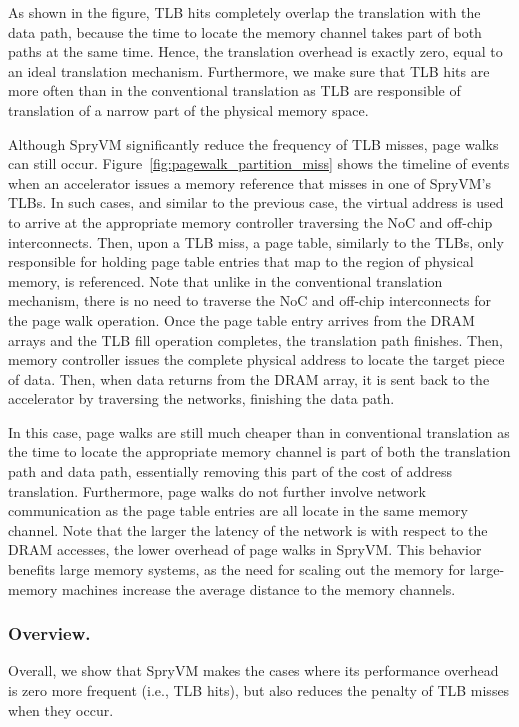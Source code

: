 As shown in the figure, TLB hits completely overlap the translation with the data path, because the time to locate the memory channel takes part of both paths at the same time. Hence, the translation overhead is exactly zero, equal to an ideal translation mechanism. Furthermore, we make sure that TLB hits are more often than in the conventional translation as TLB are responsible of translation of a narrow part of the physical memory space.

Although SpryVM significantly reduce the frequency of TLB misses, page walks can still occur. Figure~\ref{fig:pagewalk_partition_miss} shows the timeline of events when an accelerator issues a memory reference that misses in one of SpryVM's TLBs. In such cases, and similar to the previous case, the virtual address is used to arrive at the appropriate memory controller traversing the NoC and off-chip interconnects. Then, upon a TLB miss, a page table, similarly to the TLBs, only responsible for holding page table entries that map to the region of physical memory, is referenced. Note that unlike in the conventional translation mechanism, there is no need to traverse the NoC and off-chip interconnects for the page walk operation. Once the page table entry arrives from the DRAM arrays and the TLB fill operation completes, the translation path finishes. Then, memory controller issues the complete physical address to locate the target piece of data. Then, when data returns from the DRAM array, it is sent back to the accelerator by traversing the networks, finishing the data path.

In this case, page walks are still much cheaper than in conventional translation as the time to locate the appropriate memory channel is part of both the translation path and data path, essentially removing this part of the cost of address translation. Furthermore, page walks do not further involve network communication as the page table entries are all locate in the same memory channel. Note that the larger the latency of the network is with respect to the DRAM accesses, the lower overhead of page walks in SpryVM. This behavior benefits large memory systems, as the need for scaling out the memory for large-memory machines increase the average distance to the memory channels. 

\subsubsection{Overview.} Overall, we show that SpryVM makes the cases where its performance overhead is zero more frequent (i.e., TLB hits), but also reduces the penalty of TLB misses when they occur. 


